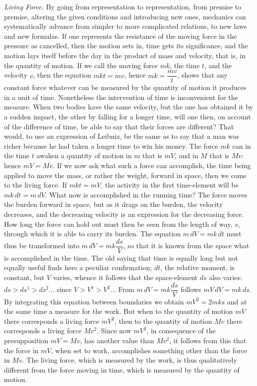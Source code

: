 \documentclass[12pt]{book}
\begin{document}
\emph{Living Force.} By going from representation to representation, from premise to
premise, altering the given conditions and introducing new ones, mechanics can
systematically advance from simpler to more complicated relations, to new laws and
new formulas. If one represents the resistance of the moving force in the pressure
as cancelled, then the motion sets in, time gets its significance, and the motion
lays itself before the day in the product of mass and velocity, that is, in the
quantity of motion. If we call the moving force $mk$, the time $t$, and the velocity
$v$, then the equation $mkt = mv$, hence $mk = \dfrac{mv}{t}$, shows that any
constant force whatever can be measured by the quantity of motion it produces in a
unit of time. Nonetheless the intervention of time is inconvenient for the measure.
When two bodies have the same velocity, but the one has obtained it by a sudden
impact, the other by falling for a longer time, will one then, on account of the
difference of time, be able to say that their forces are different? That would, to
use an expression of Leibniz, be the same as to say that a man was richer because he
had taken a longer time to win his money. The force $mk$ can in the time $t$ awaken a
quantity of motion in $m$ that is $mV$, and in $M$ that is $Mv$: hence $mV = Mv$. If
we now ask what such a force can accomplish, the time being applied to move the mass,
or rather the weight, forward in space, then we come to the living force. If $mkt =
mV$, the activity in the first time-element will be $mk\,dt = m\,dV$. What now is
accomplished in the running time? The force moves the burden forward in space, but as
it drags on the burden, the velocity decreases, and the decreasing velocity is an
expression for the decreasing force. How long the force can hold out must then be
seen from the length of way, $s$, through which it is able to carry its burden. The
equation $m\,dV = mk\,dt$ must thus be transformed into $m\,dV = mk\dfrac{ds}{V}$, so
that it is known from the space what is accomplished in the time. The old saying that
time is equally long but not equally useful finds here a peculiar confirmation; $dt$,
the relative moment, is constant, but $V$ varies, whence it follows that the
space-element $ds$ also varies: $ds > ds^1 > ds^2 \ldots$ since $V > V^1 > V^2
\ldots$ From $m\,dV = mk\dfrac{ds}{V}$ follows $mV\,dV = mk\,ds$. By integrating this
equation between boundaries we obtain $mV^2 = 2mks$ and at the same time a measure
for the work. But when to the quantity of motion $mV$ there corresponds a living
force $mV^2$, then to the quantity of motion $Mv$ there corresponds a living force
$Mv^2$. Since now $mV^2$, in consequence of the presupposition $mV = Mv$, has
another value than $Mv^2$, it follows from this that the force in $mV$, when set to
work, accomplishes something other than the force in $Mv$. The living force, which is
measured by the work, is thus qualitatively different from the force moving in time,
which is measured by the quantity of motion.
\end{document}
